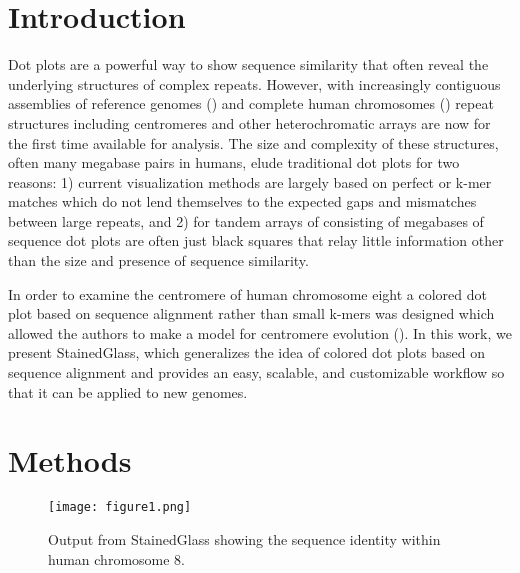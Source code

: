 \documentclass[nocrop, noinfo]{bioinfo}
\begin{document}
\section{Introduction}
Dot plots are a powerful way to show sequence similarity that often reveal the
underlying structures of complex repeats. However, with increasingly contiguous
assemblies of reference genomes (\citealp{Rhie2021-zg}) and complete human
chromosomes (\citealp{Miga2020-pj,Logsdon2021-zr,Nurk2021-wb}) repeat structures
including centromeres and other heterochromatic arrays are now for the first
time available for analysis. The size and complexity of these structures, often
many megabase pairs in humans, elude traditional dot plots for two reasons: 1)
current visualization methods are largely based on perfect or k-mer matches
which do not lend themselves to the expected gaps and mismatches between large
repeats, and 2) for tandem arrays of consisting of megabases of sequence dot
plots are often just black squares that relay little information other than the
size and presence of sequence similarity. 

In order to examine the centromere of human chromosome eight a colored dot plot
based on sequence alignment rather than small k-mers was designed which allowed
the authors to make a model for centromere evolution (\citealp{Logsdon2021-zr}).
In this work, we present StainedGlass, which generalizes the idea of colored dot
plots based on sequence alignment and provides an easy, scalable, and
customizable workflow so that it can be applied to new genomes. 

\section{Methods} 
\begin{figure}[!tpb]%
\centerline{
	\texttt{[image: figure1.png]}
}
\caption{Output from StainedGlass showing the sequence identity within human
chromosome 8.}
\label{fig:01} 
\end{figure}
\end{document}
